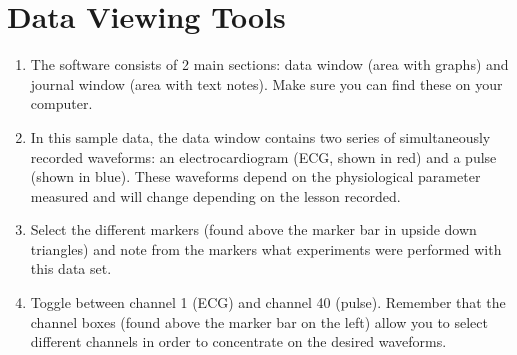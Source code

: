 \documentclass{article}
\begin{document}
\section*{Data Viewing Tools}
\begin{enumerate}
	\item The software consists of 2 main sections: data window (area with graphs) and journal window (area with text notes). Make sure you can find these on your computer.
	\item In this sample data, the data window contains two series of simultaneously recorded waveforms: an electrocardiogram (ECG, shown in red) and a pulse (shown in blue). These waveforms depend on the physiological parameter measured and will change depending on the lesson recorded.
	\item Select the different markers (found above the marker bar in upside down triangles) and note from the markers what experiments were performed with this data set.
	\item Toggle between channel 1 (ECG) and channel 40 (pulse). Remember that the channel boxes (found above the marker bar on the left) allow you to select different channels in order to concentrate on the desired waveforms.
\end{enumerate}
\end{document}
